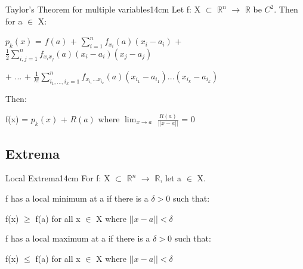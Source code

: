     \vspace{0.5cm}



    \begin{wtheorem}{Taylor's Theorem for multiple variables}{14cm}
        Let f: X $\subset$ $\mathbb{R}^n$ $\rightarrow$ $\mathbb{R}$
        be $C^2$. Then for a $\in$ X:

        \hspace{0.5cm}
        $p_k(x)$
        = $f(a)$
            + $\sum_{i=1}^n f_{x_i}(a)(x_i - a_i)$
            + $\frac{1}{2} \sum_{i,j=1}^n f_{x_ix_j}(a)(x_i - a_i)(x_j - a_j)$

            \hspace{2cm}
            + ...
            + $\frac{1}{k!} \sum_{i_1,...,i_k=1}^n
                f_{x_{i_1}...x_{i_k}}(a)(x_{i_1} - a_{i_1})...(x_{i_k} - a_{i_k})$

        Then:

        \hspace{0.5cm}
        f(x) = $p_k(x)$ + $R(a)$
        \hspace{1cm}
        where $\lim_{x \rightarrow a}$ $\frac{R(a)}{||x-a||}$ = 0
    \end{wtheorem}

    \newpage





\subsection{ Extrema }

    \begin{definition}{Local Extrema}{14cm}
        For f: X $\subset$ $\mathbb{R}^n$ $\rightarrow$ $\mathbb{R}$,
        let a $\in$ X.
        
        \hspace{0.5cm}
        f has a {\color{lblue} local minimum}
        at a if there is a $\delta > 0$ such that:

        \hspace{1cm}
        f(x) $\geq$ f(a) for all x $\in$ X where $||x-a|| < \delta$
        
        \hspace{0.5cm}
        f has a {\color{lblue} local maximum}
        at a if there is a $\delta > 0$ such that:

        \hspace{1cm}
        f(x) $\leq$ f(a) for all x $\in$ X where $||x-a|| < \delta$
    \end{definition}

